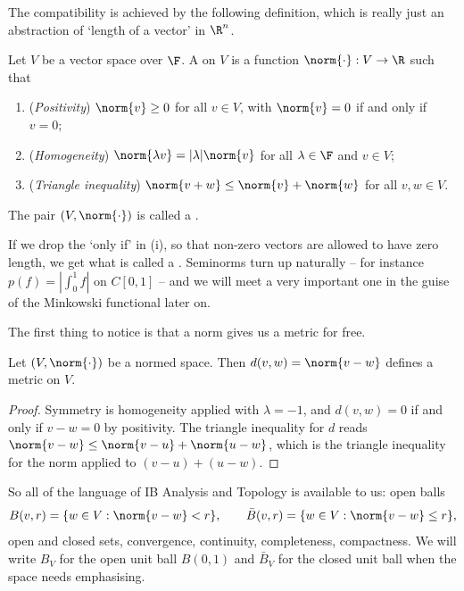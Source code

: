 The compatibility is achieved by the following definition, which is really just an abstraction of `length of a vector' in $\R^n$.

\begin{definition}[Norm]
	Let $V$ be a vector space over $\F$. A  on $V$ is a function $\norm{\cdot} : V \to \R$ such that
	\begin{enumerate}[label=(\roman*)]
		\item (\emph{Positivity}) $\norm{v} \geq 0$ for all $v \in V$, with $\norm{v} = 0$ if and only if $v = 0$;
		\item (\emph{Homogeneity}) $\norm{\lambda v} = |\lambda| \norm{v}$ for all $\lambda \in \F$ and $v \in V$;
		\item (\emph{Triangle inequality}) $\norm{v + w} \leq \norm{v} + \norm{w}$ for all $v, w \in V$.
	\end{enumerate}
	The pair $(V, \norm{\cdot})$ is called a .
\end{definition}

If we drop the `only if' in (i), so that non-zero vectors are allowed to have zero length, we get what is called a . Seminorms turn up naturally -- for instance $p(f) = |\int_0^1 f|$ on $C[0,1]$ -- and we will meet a very important one in the guise of the Minkowski functional later on.

The first thing to notice is that a norm gives us a metric for free.

\begin{proposition}
	Let $(V, \norm{\cdot})$ be a normed space. Then $d(v, w) = \norm{v - w}$ defines a metric on $V$.
\end{proposition}

\begin{proof}
	Symmetry is homogeneity applied with $\lambda = -1$, and $d(v,w) = 0$ if and only if $v - w = 0$ by positivity. The triangle inequality for $d$ reads $\norm{v - w} \leq \norm{v - u} + \norm{u - w}$, which is the triangle inequality for the norm applied to $(v - u) + (u - w)$.
\end{proof}

So all of the language of IB Analysis and Topology is available to us: open balls
$$B(v, r) = \{ w \in V : \norm{v - w} < r \}, \qquad \bar{B}(v,r) = \{ w \in V : \norm{v - w} \leq r \},$$
open and closed sets, convergence, continuity, completeness, compactness. We will write $B_V$ for the open unit ball $B(0,1)$ and $\bar{B}_V$ for the closed unit ball when the space needs emphasising.

